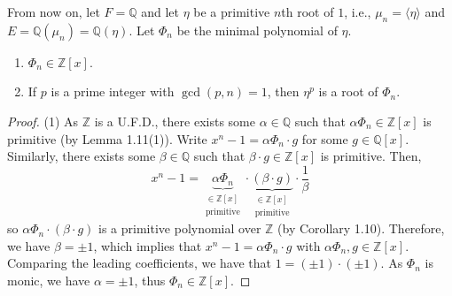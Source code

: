 \documentclass[twoside]{article}
\newcommand\Z{\mathbb Z}
\newcommand\Q{\mathbb Q}
\theoremstyle{remark}
\begin{document}
From now on, let \(F = \Q\) and let \(\eta\) be a primitive \(n\)th root of \(1\), i.e., \(\mu_n = \langle\eta\rangle\) and \(E = \Q(\mu_n) = \Q(\eta)\). Let \(\Phi_n\) be the minimal polynomial of \(\eta\).

\begin{lemma}
  \begin{enumerate}[label=\textup{(\arabic*)}, nosep]
    \item \(\Phi_n \in \Z[x]\).
    \item If \(p\) is a prime integer with \(\gcd(p, n) = 1\), then \(\eta^p\) is a root of \(\Phi_n\).
  \end{enumerate}
\end{lemma}

\begin{proof}
  (1) As \(\Z\) is a U.F.D., there exists some \(\alpha \in \Q\) such that \(\alpha \Phi_n \in \Z[x]\) is primitive (by Lemma 1.11(1)). Write \(x^n - 1 = \alpha \Phi_n \cdot g\) for some \(g \in \Q[x]\). Similarly, there exists some \(\beta \in \Q\) such that \(\beta \cdot g \in \Z[x]\) is primitive. Then,
  \[ x^n - 1 = \underbrace{\alpha \Phi_n}_{\substack{\in \Z[x] \\ \text{primitive}}} \cdot \underbrace{(\beta \cdot g)}_{\substack{\in \Z[x] \\ \text{primitive}}} \cdot \frac 1\beta \]
  so \(\alpha \Phi_n \cdot (\beta \cdot g)\) is a primitive polynomial over \(\Z\) (by Corollary 1.10). Therefore, we have \(\beta = \pm 1\), which implies that \(x^n - 1 = \alpha \Phi_n \cdot g\) with \(\alpha\Phi_n, g \in \Z[x]\). Comparing the leading coefficients, we have that \(1 = (\pm1) \cdot (\pm1)\). As \(\Phi_n\) is monic, we have \(\alpha = \pm1\), thus \(\Phi_n \in \Z[x]\).
  
  \smallskip
  

\end{proof}
\end{document}
